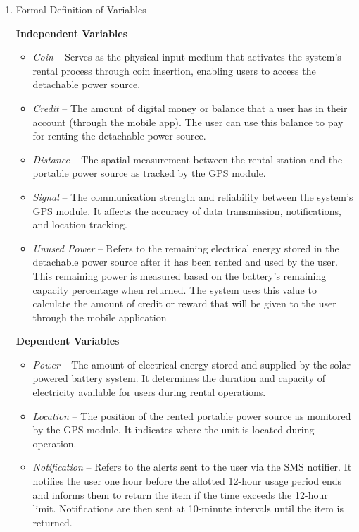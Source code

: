 {\begin{enumerate}[label=\alph*.]
	\item Formal Definition of Variables
	
	\textbf{Independent Variables}
	\begin{itemize}
		\item \textit{Coin} – Serves as the physical input medium that activates the system’s rental process through coin insertion, enabling users to access the detachable power source.
		
		\item \textit{Credit} – The amount of digital money or balance that a user has in their account (through the mobile app). The user can use this balance to pay for renting the detachable power source.
		
		\item \textit{Distance} – The spatial measurement between the rental station and the portable power source as tracked by the GPS module. 
		
		\item \textit{Signal} – The communication strength and reliability between the system’s GPS module. It affects the accuracy of data transmission, notifications, and location tracking.
		
		\item \textit{Unused Power} –  Refers to the remaining electrical energy stored in the detachable power source after it has been rented and used by the user. This remaining power is measured based on the battery’s remaining capacity percentage when returned. The system uses this value to calculate the amount of credit or reward that will be given to the user through the mobile application
	\end{itemize}
	
		\textbf{Dependent Variables}
	\begin{itemize}
		\item \textit{Power} –  The amount of electrical energy stored and supplied by the solar-powered battery system. It determines the duration and capacity of electricity available for users during rental operations.
		
		\item \textit{Location} – The position of the rented portable power source as monitored by the GPS module. It indicates where the unit is located during operation.
		
		\item \textit{Notification} –  Refers to the alerts sent to the user via the SMS notifier. It notifies the user one hour before the allotted 12-hour usage period ends and informs them to return the item if the time exceeds the 12-hour limit. Notifications are then sent at 10-minute intervals until the item is returned.
		

\end{itemize}
\end{enumerate}}
